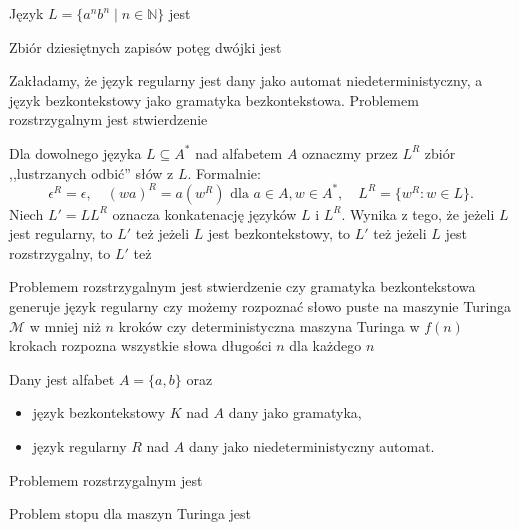 \begin{problems}
\prob Język $L = \{a^nb^n \mid n \in \mathbb{N}\}$ jest

\prob Zbiór dziesiętnych zapisów potęg dwójki jest

\prob Zakładamy, że język regularny jest dany jako automat niedeterministyczny, a język bezkontekstowy jako gramatyka bezkontekstowa. Problemem rozstrzygalnym jest stwierdzenie

\prob Dla dowolnego języka $L \subseteq A^*$ nad alfabetem $A$ oznaczmy przez $L^R$ zbiór ,,lustrzanych odbić'' słów z $L$. Formalnie: $$\epsilon^R = \epsilon, \quad (wa)^R = a(w^R) \text{ dla } a \in A, w \in A^*, \quad L^R = \{w^R : w \in L\}.$$ Niech $L' = LL^R$ oznacza konkatenację języków $L$ i $L^R$. Wynika z tego, że
    \answers
    {jeżeli $L$ jest regularny, to $L'$ też}
    {jeżeli $L$ jest bezkontekstowy, to $L'$ też}
    {jeżeli $L$ jest rozstrzygalny, to $L'$ też}

\prob Problemem rozstrzygalnym jest stwierdzenie
    \answers
    {czy gramatyka bezkontekstowa generuje język regularny}
    {czy możemy rozpoznać słowo puste na maszynie Turinga $\mathcal{M}$ w mniej niż $n$ kroków}
    {czy deterministyczna maszyna Turinga w $f(n)$ krokach rozpozna wszystkie słowa długości $n$ dla każdego $n$}
    
 \prob Dany jest alfabet $A = \{a, b\}$ oraz
    \begin{itemize}
        \item język bezkontekstowy $K$ nad $A$ dany jako gramatyka,
        \item język regularny $R$ nad $A$ dany jako niedeterministyczny automat.
    \end{itemize}
    Problemem rozstrzygalnym jest
    
    \prob Problem stopu dla maszyn Turinga jest
\end{problems}

